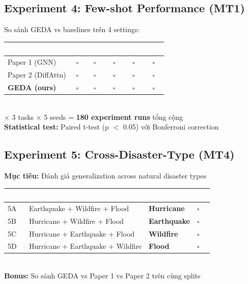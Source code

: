 \documentclass[12pt,a4paper]{article}
\begin{document}
\subsection{Experiment 4: Few-shot Performance (MT1)}

\begin{taskbox}
So sánh GEDA vs baselines trên 4 settings:
\\[0.3cm]
\begin{tabular}{lccccc}
\toprule
\rowcolor{tableheader}
\textcolor{white}{\textbf{Model}} & \textcolor{white}{\textbf{50}} & \textcolor{white}{\textbf{100}} & \textcolor{white}{\textbf{250}} & \textcolor{white}{\textbf{500}} & \textcolor{white}{\textbf{Avg}} \\
\midrule
Paper 1 (GNN) & $\square$ & $\square$ & $\square$ & $\square$ & $\square$ \\
Paper 2 (DiffAttn) & $\square$ & $\square$ & $\square$ & $\square$ & $\square$ \\
\textbf{GEDA (ours)} & $\square$ & $\square$ & $\square$ & $\square$ & $\square$ \\
\bottomrule
\end{tabular}
\\[0.3cm]
$\times$ 3 tasks $\times$ 5 seeds = \textbf{180 experiment runs} tổng cộng\\
\textbf{Statistical test:} Paired t-test (p $<$ 0.05) với Bonferroni correction
\end{taskbox}

\subsection{Experiment 5: Cross-Disaster-Type (MT4)}

\begin{taskbox}
\textbf{Mục tiêu:} Đánh giá generalization across natural disaster types
\\[0.3cm]
\begin{tabular}{llll}
\toprule
\rowcolor{tableheader}
\textcolor{white}{\textbf{Exp}} & \textcolor{white}{\textbf{Train Types}} & \textcolor{white}{\textbf{Test Type}} & \textcolor{white}{\textbf{F1}} \\
\midrule
5A & Earthquake + Wildfire + Flood & \textbf{Hurricane} & $\square$ \\
5B & Hurricane + Wildfire + Flood & \textbf{Earthquake} & $\square$ \\
5C & Hurricane + Earthquake + Flood & \textbf{Wildfire} & $\square$ \\
5D & Hurricane + Earthquake + Wildfire & \textbf{Flood} & $\square$ \\
\bottomrule
\end{tabular}
\\[0.3cm]
\textbf{Bonus:} So sánh GEDA vs Paper 1 vs Paper 2 trên cùng splits
\end{taskbox}
\end{document}
